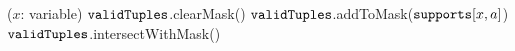 \PROCEDURE \UpdateTable($x$: variable) \label{line:updateTable:1} 
        \STATE $\texttt{validTuples}$.clearMask() \label{line:updateTable:4} 
         \label{line:updateTable:5} 
          \STATE $\texttt{validTuples}$.addToMask($\texttt{supports}[x,a]$) \label{line:updateTable:6} 
        \ENDFOREACH      
        \STATE $\texttt{validTuples}$.intersectWithMask() \label{line:updateTable:7} 

